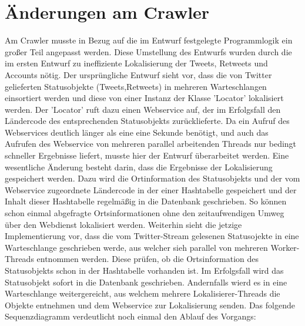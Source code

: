 \section{Änderungen am Crawler}
Am Crawler musste  in Bezug auf die im Entwurf festgelegte Programmlogik ein großer Teil angepasst werden. Diese Umstellung des Entwurfs wurden durch die im ersten Entwurf zu ineffiziente Lokalisierung der Tweets, Retweets und Accounts nötig. Der ursprüngliche Entwurf sieht vor, dass die von Twitter gelieferten Statusobjekte (Tweets,Retweets) in mehreren Warteschlangen einsortiert werden und diese von einer Instanz der Klasse 'Locator' lokalisiert werden. Der 'Locator' ruft dazu einen Webservice auf, der im Erfolgsfall den Ländercode des entsprechenden Statusobjekts zurücklieferte. Da ein Aufruf des Webservices  deutlich länger als eine eine Sekunde benötigt, und auch das Aufrufen des Webservice von mehreren parallel arbeitenden Threads nur bedingt schneller Ergebnisse liefert, musste hier der Entwurf überarbeitet werden.
Eine wesentliche Änderung besteht darin, dass die Ergebnisse der Lokalisierung gespeichert werden. Dazu wird die Ortinformation des Statusobjekts und der vom Webservice zugeordnete Ländercode in der einer Hashtabelle gespeichert und der Inhalt dieser Hashtabelle regelmäßig in die Datenbank geschrieben. So können schon einmal abgefragte Ortsinformationen ohne den zeitaufwendigen Umweg über den Webdienst lokalisiert werden. 
Weiterhin sieht die jetzige Implementierung vor, dass die vom Twitter-Stream gelesenen Statusojekte in eine Warteschlange geschrieben werde, aus welcher sieh parallel von mehreren Worker-Threads entnommen werden. Diese prüfen, ob die Ortsinformation des Statusobjekts schon in der Hashtabelle vorhanden ist. Im Erfolgsfall wird das Statusobjekt sofort in die Datenbank geschrieben. Andernfalls wierd es in eine  Warteschlange weitergereicht, aus welchem mehrere Lokalisierer-Threads die Objekte entnehmen und dem Webservice zur Lokalisierung senden.
Das folgende Sequenzdiagramm verdeutlicht noch einmal den Ablauf des Vorgangs:
